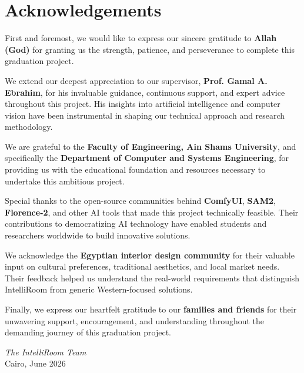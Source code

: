 
\chapter*{Acknowledgements}

\vspace{1cm}

First and foremost, we would like to express our sincere gratitude to \textbf{Allah (God)} for granting us the strength, patience, and perseverance to complete this graduation project.

\vspace{0.5cm}

We extend our deepest appreciation to our supervisor, \textbf{Prof. Gamal A. Ebrahim}, for his invaluable guidance, continuous support, and expert advice throughout this project. His insights into artificial intelligence and computer vision have been instrumental in shaping our technical approach and research methodology.

\vspace{0.5cm}

We are grateful to the \textbf{Faculty of Engineering, Ain Shams University}, and specifically the \textbf{Department of Computer and Systems Engineering}, for providing us with the educational foundation and resources necessary to undertake this ambitious project.

\vspace{0.5cm}

Special thanks to the open-source communities behind \textbf{ComfyUI}, \textbf{SAM2}, \textbf{Florence-2}, and other AI tools that made this project technically feasible. Their contributions to democratizing AI technology have enabled students and researchers worldwide to build innovative solutions.

\vspace{0.5cm}

We acknowledge the \textbf{Egyptian interior design community} for their valuable input on cultural preferences, traditional aesthetics, and local market needs. Their feedback helped us understand the real-world requirements that distinguish IntelliRoom from generic Western-focused solutions.

\vspace{0.5cm}

Finally, we express our heartfelt gratitude to our \textbf{families and friends} for their unwavering support, encouragement, and understanding throughout the demanding journey of this graduation project.

\vspace{1cm}

\begin{flushright}
    \textit{The IntelliRoom Team}\\
    Cairo, June 2026
\end{flushright}
